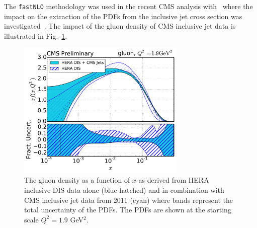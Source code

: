 \begin{description}
\begin{itemize}
The \texttt{fastNLO} methodology was used in the recent CMS analysis with \fitter\ where the impact
on the extraction of the PDFs from the inclusive jet cross section was investigated~\cite{cms:jets}. 
The impact of the gluon density of CMS inclusive jet data is illustrated in Fig.~\ref{fig:cmsjet}.
\begin{figure}[!ht]
   \centering
   \includegraphics[width=8cm]{CMSjets.pdf}
   \caption{The gluon density as a function of $x$ as derived from HERA inclusive DIS data 
            alone (blue hatched) and in combination with CMS inclusive jet data from 2011 (cyan)
            where bands represent the total uncertainty of the PDFs. 
            The PDFs are shown at the starting scale $Q^2= 1.9$ GeV$^2$.}
 \label{fig:cmsjet}
\end{figure}


\end{itemize}

\end{description}

